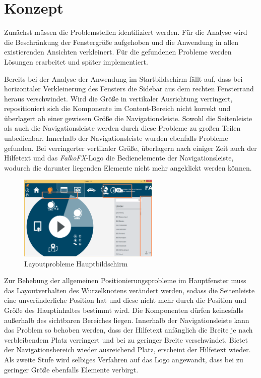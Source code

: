 \section{Konzept} \label{sec:responsiveConcept}
Zunächst müssen die Problemstellen identifiziert werden. Für die Analyse wird die Beschränkung der Fenstergröße aufgehoben und die Anwendung in allen existierenden Ansichten verkleinert. Für die gefundenen Probleme werden Lösungen erarbeitet und später implementiert.\par
{}
Bereits bei der Analyse der Anwendung im Startbildschirm fällt auf, dass bei horizontaler Verkleinerung des Fensters die Sidebar aus dem rechten Fensterrand heraus verschwindet. Wird die Größe in vertikaler Ausrichtung verringert, repositioniert sich die Komponente im Content-Bereich nicht korrekt und überlagert ab einer gewissen Größe die Navigationsleiste. Sowohl die Seitenleiste als auch die Navigationsleiste werden durch diese Probleme zu großen Teilen unbedienbar. Innerhalb der Navigationsleiste wurden ebenfalls Probleme gefunden. Bei verringerter vertikaler Größe, überlagern nach einiger Zeit auch der Hilfetext und das \textit{FalkoFX}-Logo die Bedienelemente der Navigationsleiste, wodurch die darunter liegenden Elemente nicht mehr angeklickt werden können.\par
\begin{figure}[H]
 \centering
 \includegraphics[width=0.6\textwidth]{grafiken/radial_bug.png}
 \caption{Layoutprobleme Hauptbildschirm}
 \label{fig:layoutMainScreen}
\end{figure}
Zur Behebung der allgemeinen Positionierungsprobleme im Hauptfenster muss das Layoutverhalten des Wurzelknotens verändert werden, sodass die Seitenleiste eine unveränderliche Position hat und diese nicht mehr durch die Position und Größe des Hauptinhaltes bestimmt wird. Die Komponenten dürfen keinesfalls außerhalb des sichtbaren Bereiches liegen. Innerhalb der Navigationsleiste kann das Problem so behoben werden, dass der Hilfetext anfänglich die Breite je nach verbleibendem Platz verringert und bei zu geringer Breite verschwindet. Bietet der Navigationsbereich wieder ausreichend Platz, erscheint der Hilfetext wieder. Als zweite Stufe wird selbiges Verfahren auf das Logo angewandt, dass bei zu geringer Größe ebenfalls Elemente verbirgt.\par
